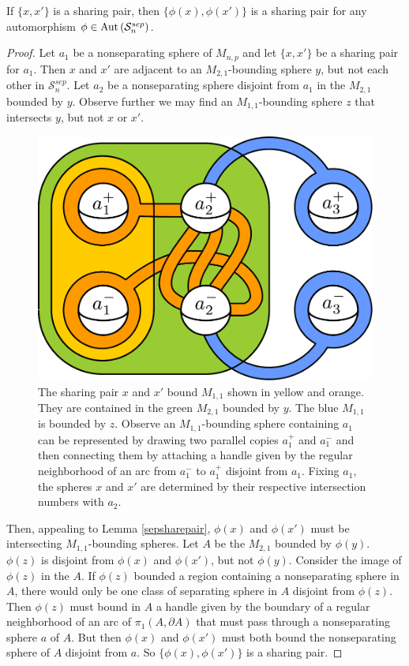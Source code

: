 \begin{lemma}
  \label{sepsharepair}
If $\{x,x'\}$ is a sharing pair, then $\{\phi(x),\phi(x')\}$
is a sharing pair for any
automorphism $\phi \in \operatorname{Aut}\left( \mathcal S^{sep}_{n} \right )$.
\end{lemma}

\begin{proof}
Let $a_1$ be a nonseparating sphere of $M_{n,p}$
and let $\{x,x'\}$ be a sharing pair for $a_1$.
Then $x$ and $x'$ are adjacent to an $M_{2,1}$-bounding sphere $y$,
but not each other in $\mathcal S^{sep}_{n}$.
Let $a_2$ be a nonseparating sphere disjoint from $a_1$ in the $M_{2,1}$ bounded by $y$.
Observe further we may find an $M_{1,1}$-bounding sphere
$z$ that intersects $y$, but not $x$ or $x'$.
\begin{figure}
\includegraphics[width=.6\textwidth]{figures/sepsharepair.pdf}
\caption{
The sharing pair $x$ and $x'$ bound $M_{1,1}$ shown in yellow and orange.
They are contained in the green $M_{2,1}$ bounded by $y$.
The blue $M_{1,1}$ is bounded by $z$.
Observe an $M_{1,1}$-bounding sphere containing $a_1$ can be represented
by drawing two parallel copies $a^+_1$ and $a^-_1$ and then connecting them
by attaching a handle given by the regular neighborhood of an arc from $a_1^-$ to $a^+_1$ disjoint from $a_1$.
Fixing $a_1$, the spheres $x$ and $x'$ are determined by their respective intersection numbers with $a_2$.
}
\label{sepshare}
\end{figure}
Then, appealing to Lemma \ref{sepsharepair}, $\phi(x)$ and $\phi(x')$
must be intersecting $M_{1,1}$-bounding spheres.
Let $A$ be the $M_{2,1}$ bounded by $\phi(y)$.
$\phi(z)$ is disjoint from $\phi(x)$ and $\phi(x')$, but not $\phi(y)$.
Consider the image of $\phi(z)$ in the $A$.
If $\phi(z)$ bounded a region containing a nonseparating sphere in
$A$, there would only be one class of separating sphere in $A$
disjoint from $\phi(z)$.
Then $\phi(z)$  must bound in $A$
a handle given by the boundary of a regular neighborhood of an arc of
$\pi_1(A,\partial A)$ that must pass through a nonseparating sphere $a$ of $A$.
But then $\phi(x)$ and $\phi(x')$ must both bound the nonseparating sphere of $A$ disjoint from $a$.
So $\{\phi(x),\phi(x')\}$ is a sharing pair.
\end{proof}


